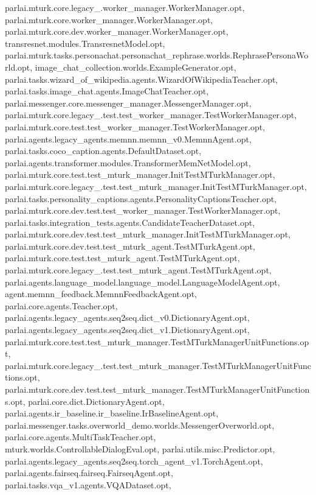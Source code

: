 parlai.\+mturk.\+core.\+legacy\+\_.\+worker\+\_\+manager.\+Worker\+Manager.\+opt, parlai.\+mturk.\+core.\+worker\+\_\+manager.\+Worker\+Manager.\+opt, parlai.\+mturk.\+core.\+dev.\+worker\+\_\+manager.\+Worker\+Manager.\+opt, transresnet.\+modules.\+Transresnet\+Model.\+opt, parlai.\+mturk.\+tasks.\+personachat.\+personachat\+\_\+rephrase.\+worlds.\+Rephrase\+Persona\+World.\+opt, image\+\_\+chat\+\_\+collection.\+worlds.\+Example\+Generator.\+opt, parlai.\+tasks.\+wizard\+\_\+of\+\_\+wikipedia.\+agents.\+Wizard\+Of\+Wikipedia\+Teacher.\+opt, parlai.\+tasks.\+image\+\_\+chat.\+agents.\+Image\+Chat\+Teacher.\+opt, parlai.\+messenger.\+core.\+messenger\+\_\+manager.\+Messenger\+Manager.\+opt, parlai.\+mturk.\+core.\+legacy\+\_.\+test.\+test\+\_\+worker\+\_\+manager.\+Test\+Worker\+Manager.\+opt, parlai.\+mturk.\+core.\+test.\+test\+\_\+worker\+\_\+manager.\+Test\+Worker\+Manager.\+opt, parlai.\+agents.\+legacy\+\_\+agents.\+memnn.\+memnn\+\_\+v0.\+Memnn\+Agent.\+opt, parlai.\+tasks.\+coco\+\_\+caption.\+agents.\+Default\+Dataset.\+opt, parlai.\+agents.\+transformer.\+modules.\+Transformer\+Mem\+Net\+Model.\+opt, parlai.\+mturk.\+core.\+test.\+test\+\_\+mturk\+\_\+manager.\+Init\+Test\+M\+Turk\+Manager.\+opt, parlai.\+mturk.\+core.\+legacy\+\_.\+test.\+test\+\_\+mturk\+\_\+manager.\+Init\+Test\+M\+Turk\+Manager.\+opt, parlai.\+tasks.\+personality\+\_\+captions.\+agents.\+Personality\+Captions\+Teacher.\+opt, parlai.\+mturk.\+core.\+dev.\+test.\+test\+\_\+worker\+\_\+manager.\+Test\+Worker\+Manager.\+opt, parlai.\+tasks.\+integration\+\_\+tests.\+agents.\+Candidate\+Teacher\+Dataset.\+opt, parlai.\+mturk.\+core.\+dev.\+test.\+test\+\_\+mturk\+\_\+manager.\+Init\+Test\+M\+Turk\+Manager.\+opt, parlai.\+mturk.\+core.\+dev.\+test.\+test\+\_\+mturk\+\_\+agent.\+Test\+M\+Turk\+Agent.\+opt, parlai.\+mturk.\+core.\+test.\+test\+\_\+mturk\+\_\+agent.\+Test\+M\+Turk\+Agent.\+opt, parlai.\+mturk.\+core.\+legacy\+\_.\+test.\+test\+\_\+mturk\+\_\+agent.\+Test\+M\+Turk\+Agent.\+opt, parlai.\+agents.\+language\+\_\+model.\+language\+\_\+model.\+Language\+Model\+Agent.\+opt, agent.\+memnn\+\_\+feedback.\+Memnn\+Feedback\+Agent.\+opt, parlai.\+core.\+agents.\+Teacher.\+opt, parlai.\+agents.\+legacy\+\_\+agents.\+seq2seq.\+dict\+\_\+v0.\+Dictionary\+Agent.\+opt, parlai.\+agents.\+legacy\+\_\+agents.\+seq2seq.\+dict\+\_\+v1.\+Dictionary\+Agent.\+opt, parlai.\+mturk.\+core.\+test.\+test\+\_\+mturk\+\_\+manager.\+Test\+M\+Turk\+Manager\+Unit\+Functions.\+opt, parlai.\+mturk.\+core.\+legacy\+\_.\+test.\+test\+\_\+mturk\+\_\+manager.\+Test\+M\+Turk\+Manager\+Unit\+Functions.\+opt, parlai.\+mturk.\+core.\+dev.\+test.\+test\+\_\+mturk\+\_\+manager.\+Test\+M\+Turk\+Manager\+Unit\+Functions.\+opt, parlai.\+core.\+dict.\+Dictionary\+Agent.\+opt, parlai.\+agents.\+ir\+\_\+baseline.\+ir\+\_\+baseline.\+Ir\+Baseline\+Agent.\+opt, parlai.\+messenger.\+tasks.\+overworld\+\_\+demo.\+worlds.\+Messenger\+Overworld.\+opt, parlai.\+core.\+agents.\+Multi\+Task\+Teacher.\+opt, mturk.\+worlds.\+Controllable\+Dialog\+Eval.\+opt, parlai.\+utils.\+misc.\+Predictor.\+opt, parlai.\+agents.\+legacy\+\_\+agents.\+seq2seq.\+torch\+\_\+agent\+\_\+v1.\+Torch\+Agent.\+opt, parlai.\+agents.\+fairseq.\+fairseq.\+Fairseq\+Agent.\+opt, parlai.\+tasks.\+vqa\+\_\+v1.\+agents.\+V\+Q\+A\+Dataset.\+opt, 
